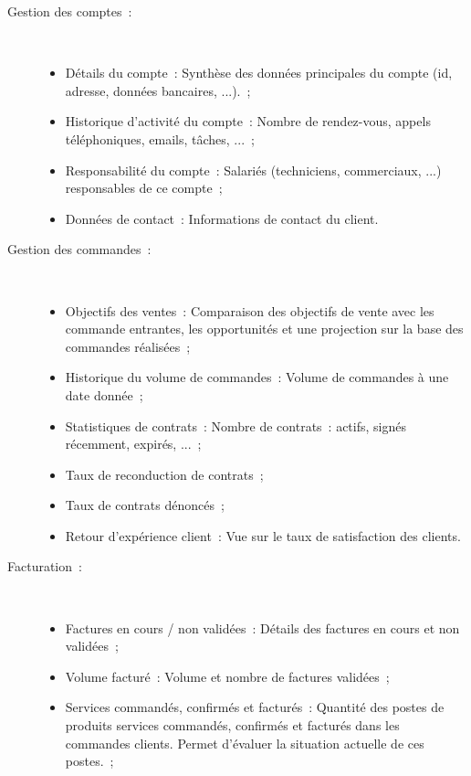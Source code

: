     \begin{description}
        \item[Gestion des comptes~:] ~ \\
            \begin{itemize}
                \item Détails du compte~: Synthèse des données principales du compte (id, adresse, données bancaires, ...).~;
                \item Historique d'activité du compte~: Nombre de rendez-vous, appels téléphoniques, emails, tâches, ...~;
                \item Responsabilité du compte~: Salariés (techniciens, commerciaux, ...) responsables de ce compte~;
                \item Données de contact~: Informations de contact du client.
            \end{itemize}

        \item[Gestion des commandes~:] ~ \\
            \begin{itemize}
                \item Objectifs des ventes~: Comparaison des objectifs de vente avec les commande entrantes, les opportunités et une projection sur la base des commandes réalisées~;
                \item Historique du volume de commandes~: Volume de commandes à une date donnée~;
                \item Statistiques de contrats~: Nombre de contrats~: actifs, signés récemment, expirés, ...~;
                \item Taux de reconduction de contrats~;
                \item Taux de contrats dénoncés~;
                \item Retour d'expérience client~: Vue sur le taux de satisfaction des clients.
            \end{itemize}

        \item[Facturation~:] ~ \\
            \begin{itemize}
                \item Factures en cours / non validées~: Détails des factures en cours et non validées~;
                \item Volume facturé~: Volume et nombre de factures validées~;
                \item Services commandés, confirmés et facturés~: Quantité des postes de produits services commandés, confirmés et facturés dans les commandes clients. Permet d'évaluer la situation actuelle de ces postes.~;
            \end{itemize}


\end{description}
